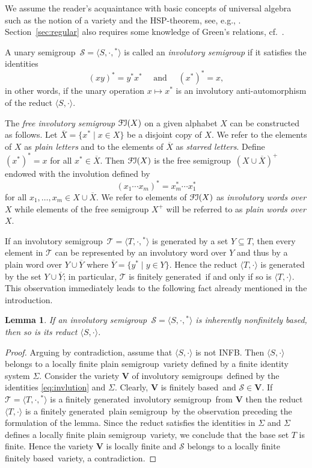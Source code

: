 \documentclass[smallextended]{svjour3}
\newcommand{\sgp}{semi\-group}
\newcommand{\is}{involutory semi\-group}
\newcommand{\iss}{involutory semi\-groups}
\newcommand{\fb}{finitely based}
\newcommand{\fg}{finitely generated}
\newcommand{\infb}{inherently non\-finitely based}
\newcommand{\FI}{\ensuremath{\mathcal{F\kern-.3pt I}}}
\newtheorem{Lemma}[Thm]{Lemma}
\begin{document}
We assume the reader's acquaintance with basic concepts of universal algebra such as the notion of a variety and the HSP-theorem, see,
e.g., \cite[Chapter~II]{BuSa81}. Section~\ref{sec:regular} also requires some knowledge of Green's relations, cf.~\cite[Chapter~2]{how}.

A unary \sgp\ $\mathcal{S}=\langle S,\cdot,{}^*\rangle$ is called an \emph{\is} if it satisfies the identities
\begin{equation}
\label{eq:invlution} (xy)^*=y^*x^* \quad \text{ and  }\quad (x^*)^*=x,
\end{equation}
in other words, if the unary operation $x\mapsto x^*$ is an involutory anti-automorphism of the reduct $\langle S,\cdot\rangle$.

The \emph{free \is} $\FI(X)$ on a given alphabet $X$ can be constructed as follows.  Let $\overline{X}=\{x^*\mid x\in X\}$ be a disjoint
copy of $X$. We refer to the elements of $X$ as \emph{plain letters} and to the elements of $\overline{X}$ as \emph{starred letters}.
Define $(x^*)^*=x$ for all $x^*\in \overline{X}$. Then $\FI(X)$ is the free \sgp\ $(X\cup\overline{X})^+$ endowed with the involution
defined by
$$(x_1\cdots x_m)^* = x_m^*\cdots x_1^*$$
for all $x_1,\dots,x_m\in X\cup \overline{X}$. We refer to elements of $\FI(X)$ as \emph{involutory words over $X$} while elements of the
free semigroup $X^+$ will be referred to as \emph{plain words over $X$}.

If an \is\ $\mathcal{T}=\langle T,\cdot,{}^*\rangle$ is generated by a set $Y\subseteq T$, then every element in $\mathcal{T}$ can be
represented by an involutory word over $Y$ and thus by a plain word over $Y\cup\overline{Y}$ where $\overline{Y}=\{y^*\mid y\in Y\}$. Hence
the reduct $\langle T,\cdot\rangle$ is generated by the set $Y\cup\overline{Y}$; in particular, $\mathcal{T}$ is \fg\ if and only if so is
$\langle T,\cdot\rangle$. This observation immediately leads to the following fact already mentioned in the introduction.

\begin{Lemma}
\label{easy} If an \is\ $\mathcal{S}=\langle S,\cdot,{}^*\rangle$ is \infb, then so is its reduct $\langle S,\cdot\rangle$.
\end{Lemma}

\begin{proof}
Arguing by contradiction, assume that $\langle S,\cdot\rangle$ is not INFB. Then $\langle S,\cdot\rangle$ belongs to a locally finite plain
\sgp\ variety defined by a finite identity system $\Sigma$. Consider the variety $\mathbf{V}$ of \iss\ defined by the identities
\eqref{eq:invlution} and $\Sigma$. Clearly, $\mathbf{V}$ is \fb\ and $\mathcal{S}\in\mathbf{V}$. If $\mathcal{T}=\langle
T,\cdot,{}^*\rangle$ is a \fg\ \is\ from $\mathbf{V}$ then the reduct $\langle T,\cdot\rangle$ is a \fg\ plain \sgp\ by the observation
preceding the formulation of the lemma. Since the reduct satisfies the identities in $\Sigma$ and $\Sigma$ defines a locally finite plain
\sgp\ variety, we conclude that the base set $T$ is finite. Hence the variety $\mathbf{V}$ is locally finite and $\mathcal{S}$ belongs to a
locally finite \fb\ variety, a contradiction.
\end{proof}
\end{document}
